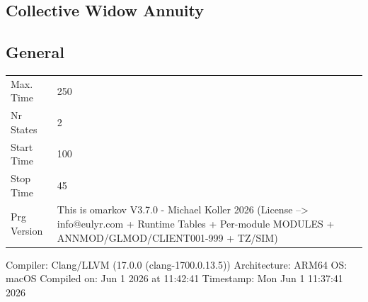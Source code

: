 \documentclass[11pt,a4paper]{article}
\begin{document}
\begin{small} 
\section{Collective Widow Annuity} 
\subsection{General} 
\par \bigskip      
\begin{tabular}{ll} 
Max. Time  & 250 \\ 
Nr States  & 2 \\ 
Start Time & 100 \\ 
Stop Time  & 45 \\ 
Prg Version  &  This is omarkov V3.7.0 - Michael Koller 2026 (License --> info@eulyr.com + Runtime Tables + Per-module MODULES + ANNMOD/GLMOD/CLIENT001-999 + TZ/SIM) 
 \\ 
\end{tabular}       
\par \bigskip      
Compiler: Clang/LLVM (17.0.0 (clang-1700.0.13.5))
Architecture: ARM64
OS: macOS
Compiled on: Jun  1 2026 at 11:42:41
Timestamp: Mon Jun  1 11:37:41 2026
 

\end{small}
\end{document}

